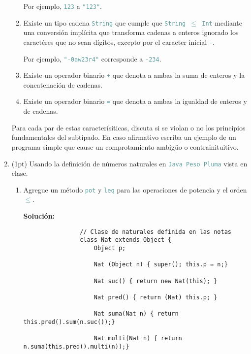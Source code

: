 \documentclass{article}
\newcommand{\tx}[1]{\textcolor{CadetBlue} {\texttt{#1}}}
\newcommand{\tb}[1]{\textcolor{RoyalPurple} {\textbf{#1}}}
\newcommand{\pt}[1]{\textcolor{RoyalPurple}{(#1pt)}}
\begin{document}
\begin{enumerate}
\begin{enumerate}
            Por ejemplo, \tx{123} a \tx{"123"}.

            \item Existe un tipo cadena \tx{String} que cumple que 
            \tx{String $\leq$ Int} mediante una conversión implícita que 
            transforma cadenas a enteros ignorado los caractéres que no sean
            dígitos, excepto por el caracter inicial \tx{-}.

            Por ejemplo, \tx{"}\tx{-0aw23r4"} corresponde a \tx{-234}.

            \item Existe un operador binario \tx{+} que denota a ambas la suma 
            de enteros y la concatenación de cadenas.

            \item Existe un operador binario \tx{=} que denota a ambas la 
            igualdad de enteros y de cadenas.
        \end{enumerate}

        Para cada par de estas caracterísiticas, discuta si se violan o no los 
        principios fundamentales del subtipado. En caso afirmativo escriba un
        ejemplo de un programa simple que cause un comprotamiento ambigüo o 
        contrainituitivo.

        \item \pt{1} Usando la definición de números naturales en 
        \tx{Java Peso Pluma} vista en clase.

        \begin{enumerate}
            \item Agregue un método \tx{pot} y \tx{leq} para las operaciones de
            potencia y el orden \tx{$\leq$}.

            \tb{Solución:}

            \begin{verbatim}
                // Clase de naturales definida en las notas
                class Nat extends Object {
                    Object p;

                    Nat (Object n) { super(); this.p = n;}

                    Nat suc() { return new Nat(this); }

                    Nat pred() { return (Nat) this.p; }

                    Nat suma(Nat n) { return this.pred().sum(n.suc());}

                    Nat multi(Nat n) { return n.suma(this.pred().multi(n));}


\end{verbatim}
\end{enumerate}
\end{enumerate}
\end{document}
